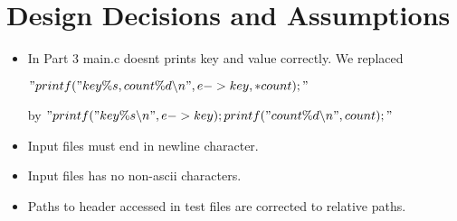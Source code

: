 \documentclass{article}
\begin{document}
\section*{Design Decisions and Assumptions}
\begin{itemize}
    \item In Part 3 main.c doesnt prints key and value correctly. We replaced
    
        $"printf("key \%s, count \%d  \backslash n", e->key, *count);"$
    
    
    by   $"printf("key \%s\backslash n", e->key);printf("count \%d \backslash n", \*count);"$
    \item Input files must end in newline character.
    \item Input files has no non-ascii characters.
    \item Paths to header accessed in test files are corrected to relative paths.
\end{itemize}
\end{document}
